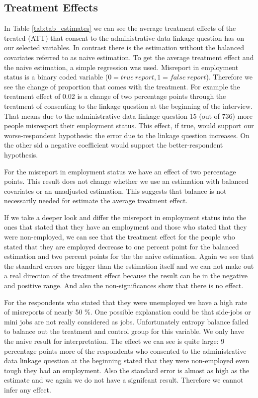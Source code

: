

\subsection{Treatment Effects}

In Table \ref{tab:tab_estimates} we can see the average treatment effects of the treated (ATT) that consent to the administrative data linkage question has on our selected variables. In contrast there is the estimation without the balanced covariates referred to as naive estimation. To get the average treatment effect and the naive estimation, a simple regression was used. Misreport in employment status is a binary coded variable (\(0=true\ report, 1=false \ report\)). Therefore we see the change of proportion that comes with the treatment. For example the treatment effect of 0.02 is a change of two percentage points through the treatment of consenting to the linkage question at the beginning of the interview. That means due to the administrative data linkage question 15 (out of 736) more people misresport their employment status. This effect, if true, would support our worse-respondent hypothesis: the error due to the linkage question increases. On the other sid a negative coefficient would support the better-respondent hypothesis.

For the misreport in employment status we have an effect of two percentage points. This result does not change whether we use an estimation with balanced covariates or an unadjusted estimation. This suggests that balance is not necessarily needed for estimate the average treatment effect.

If we take a deeper look and differ the misreport in employment status into the ones that stated that they have an employment and those who stated that they were non-employed, we can see that the treatment effect for the people who stated that they are employed decrease to one percent point for the balanced estimation and two percent points for the the naive estimation. Again we see that the standard errors are bigger than the estimation itself and we can not make out a real direction of the treatment effect because the result can be in the negative and positive range. And also the non-significances show that there is no effect.

For the respondents who stated that they were unemployed we have a high rate of misreports of nearly 50 \%. One possible explanation could be that side-jobs or mini jobs are not really considered as jobs. Unfortunately entropy balance failed to balance out the treatment and control group for this variable. We only have the naive result for interpretation. The effect we can see is quite large: 9 percentage points more of the respondents who consented to the administrative data linkage question at the beginning stated that they were non-employed even tough they had an employment. Also the standard error is almost as high as the estimate and we again we do not have a signifcant result. Therefore we cannot infer any effect.

